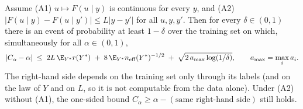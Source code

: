 \begin{theorem}
Assume
(A1) $u\mapsto F(u\mid y)$ is continuous for every $y$, and
(A2) $|F(u\mid y)-F(u\mid y')|\le L|y-y'|$ for all $u,y,y'$.
Then for every $\delta\in(0,1)$ there is an event of probability at least $1-\delta$ over the
training set on which, simultaneously for all $\alpha\in(0,1)$,
\[
|C_\alpha-\alpha|\;\le\;2L\,\E_{Y^*}r(Y^*)\;+\;8\,\E_{Y^*}n_{\mathrm{eff}}(Y^*)^{-1/2}
\;+\;\sqrt{2\,a_{\max}\log(1/\delta)},\qquad a_{\max}=\max_ia_i .
\]
The right-hand side depends on the training set only through its labels (and on the law of
$Y$ and on $L$, so it is not computable from the data alone). Under (A2) without (A1), the
one-sided bound $C_\alpha\ge\alpha-(\text{same right-hand side})$ still holds.
\end{theorem}

